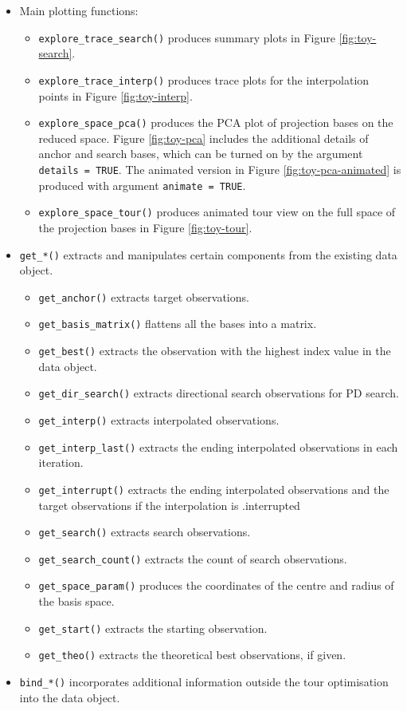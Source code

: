 \begin{itemize}
\item
  Main plotting functions:

  \begin{itemize}
  \tightlist
  \item
    \texttt{explore\_trace\_search()} produces summary plots in Figure \ref{fig:toy-search}.
  \item
    \texttt{explore\_trace\_interp()} produces trace plots for the interpolation points in Figure \ref{fig:toy-interp}.
  \item
    \texttt{explore\_space\_pca()} produces the PCA plot of projection bases on the reduced space. Figure \ref{fig:toy-pca} includes the additional details of anchor and search bases, which can be turned on by the argument \texttt{details\ =\ TRUE}. The animated version in Figure \ref{fig:toy-pca-animated} is produced with argument \texttt{animate\ =\ TRUE}.
  \item
    \texttt{explore\_space\_tour()} produces animated tour view on the full space of the projection bases in Figure \ref{fig:toy-tour}.
  \end{itemize}
\item
  \texttt{get\_*()} extracts and manipulates certain components from the existing data object.

  \begin{itemize}
  \tightlist
  \item
    \texttt{get\_anchor()} extracts target observations.
  \item
    \texttt{get\_basis\_matrix()} flattens all the bases into a matrix.
  \item
    \texttt{get\_best()} extracts the observation with the highest index value in the data object.
  \item
    \texttt{get\_dir\_search()} extracts directional search observations for PD search.
  \item
    \texttt{get\_interp()} extracts interpolated observations.
  \item
    \texttt{get\_interp\_last()} extracts the ending interpolated observations in each iteration.
  \item
    \texttt{get\_interrupt()} extracts the ending interpolated observations and the target observations if the interpolation is .interrupted
  \item
    \texttt{get\_search()} extracts search observations.
  \item
    \texttt{get\_search\_count()} extracts the count of search observations.
  \item
    \texttt{get\_space\_param()} produces the coordinates of the centre and radius of the basis space.
  \item
    \texttt{get\_start()} extracts the starting observation.
  \item
    \texttt{get\_theo()} extracts the theoretical best observations, if given.
  \end{itemize}
\item
  \texttt{bind\_*()} incorporates additional information outside the tour optimisation into the data object.


\end{itemize}
